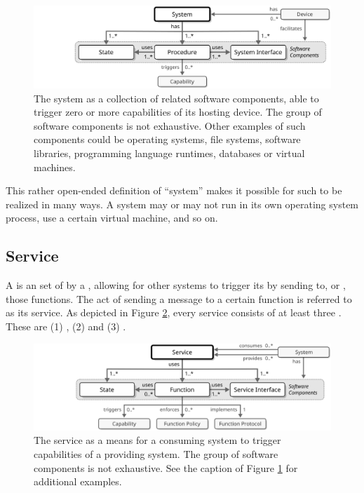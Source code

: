 \begin{figure}[ht!]
  \centering
  \includegraphics[scale=0.9]{figures/system}
  \caption{
    The system as a collection of related software components, able to trigger zero or more capabilities of its hosting device.
    The group of software components is not exhaustive.
    Other examples of such components could be operating systems, file systems, software libraries, programming language runtimes, databases or virtual machines.
  }
  \label{fig:system}
\end{figure}

This rather open-ended definition of ``system'' makes it possible for such to be realized in many ways.
A system may or may not run in its own operating system process, use a certain virtual machine, and so on.

\subsection{Service}
\label{sec:reference-model:service}

A  is an  set of   by a , allowing for other systems to trigger its  by sending  to, or , those functions.
The act of sending a message to a certain function is referred to as  its service.
As depicted in Figure \ref{fig:service}, every service consists of at least three .
These are (1) , (2)  and (3) .

\begin{figure}[ht!]
  \centering
  \includegraphics[scale=0.9]{figures/service}
  \caption{
    The service as a means for a consuming system to trigger capabilities of a providing system.
    The group of software components is not exhaustive.
    See the caption of Figure \ref{fig:system} for additional examples.
  }
  \label{fig:service}
\end{figure}

